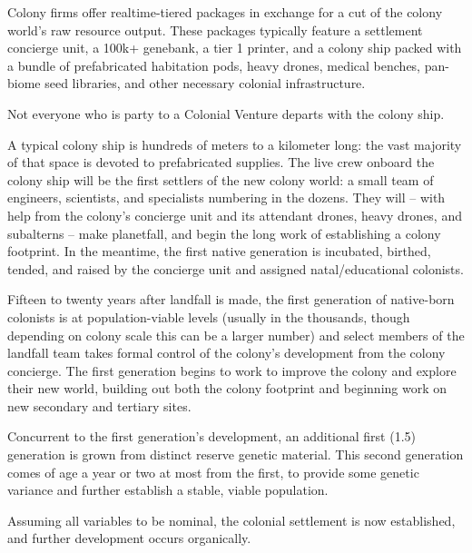 Colony firms offer realtime-tiered packages in exchange for a cut of the colony world's raw
resource output. These packages typically feature a settlement concierge unit, a 100k+
genebank, a tier 1 printer, and a colony ship packed with a bundle of prefabricated habitation
pods, heavy drones, medical benches, pan-biome seed libraries, and other necessary colonial
infrastructure.

Not everyone who is party to a Colonial Venture departs with the colony ship.

A typical colony ship is hundreds of meters to a kilometer long: the vast majority of that space is
devoted to prefabricated supplies. The live crew onboard the colony ship will be the first settlers
of the new colony world: a small team of engineers, scientists, and specialists numbering in the
dozens. They will -- with help from the colony's concierge unit and its attendant drones, heavy
drones, and subalterns -- make planetfall, and begin the long work of establishing a colony
footprint. In the meantime, the first native generation is incubated, birthed, tended, and raised by
the concierge unit and assigned natal/educational colonists.

Fifteen to twenty years after landfall is made, the first generation of native-born colonists is at
population-viable levels (usually in the thousands, though depending on colony scale this can be
a larger number) and select members of the landfall team takes formal control of the colony's
development from the colony concierge. The first generation begins to work to improve the
colony and explore their new world, building out both the colony footprint and beginning work on
new secondary and tertiary sites.

Concurrent to the first generation's development, an additional first (1.5) generation is grown
from distinct reserve genetic material. This second generation comes of age a year or two at
most from the first, to provide some genetic variance and further establish a stable, viable
population.

Assuming all variables to be nominal, the colonial settlement is now established, and further
development occurs organically.